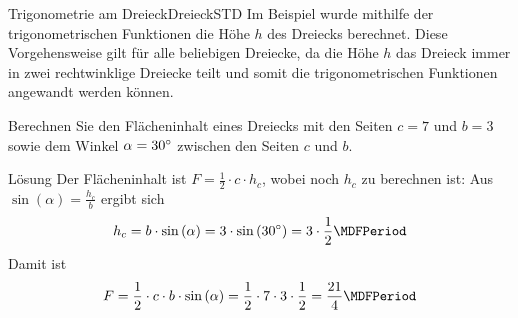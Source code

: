 \begin{MXContent}{Trigonometrie am Dreieck}{Dreieck}{STD}
Im Beispiel 
 wurde mithilfe der trigonometrischen Funktionen die H\"ohe $h$ des Dreiecks 
berechnet. Diese Vorgehensweise gilt f\"ur alle beliebigen Dreiecke, da die 
H\"ohe $h$ das Dreieck immer in zwei rechtwinklige Dreiecke teilt und somit 
die trigonometrischen Funktionen angewandt werden k\"onnen.

\begin{MExercise}
Berechnen Sie den Fl\"acheninhalt eines Dreiecks mit den Seiten $c=7$ und $b=3$
sowie dem Winkel $\alpha=30{}^{\circ}$ zwischen den Seiten $c$ und $b$.

\begin{MHint}{L\"osung}
Der Fl\"acheninhalt ist $F =\frac{1}{2}\cdot c \cdot h_c$, wobei noch $h_c$
zu berechnen ist:
Aus $\sin\left(\alpha\right)=\frac{h_c}{b}$
ergibt sich
\[
 h_c=b\cdot\sin\left(\alpha\right) %
  = 3\cdot\sin\left(30^\circ\right) %
  = 3\cdot\frac{1}{2} \MDFPeriod %
\]
Damit ist
\[ 
F =\frac{1}{2}\cdot c\cdot b\cdot\sin\left(\alpha\right) %
  =\frac{1}{2}\cdot 7 \cdot3\cdot\frac{1}{2}=\frac{21}{4} \MDFPeriod %
\]
\end{MHint}
\end{MExercise}

\end{MXContent}


